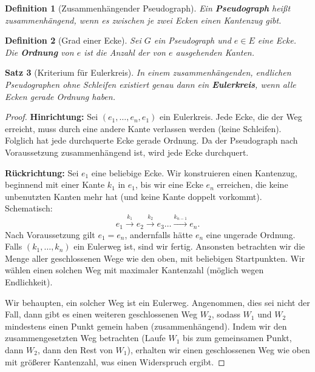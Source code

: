 \documentclass[a4paper,12pt]{article}
\theoremstyle{break}
\newtheorem{definition}{Definition}[section]
\newtheorem{theorem}[definition]{Satz}
\begin{document}
\begin{definition}[Zusammenhängender Pseudograph]
Ein \textbf{Pseudograph} heißt \textit{zusammenhängend}, wenn es zwischen je zwei Ecken einen Kantenzug gibt.
\end{definition}

\begin{definition}[Grad einer Ecke]
Sei \( G \) ein Pseudograph und \( e \in E \) eine Ecke. Die \textbf{Ordnung} von \( e \) ist die Anzahl der von \( e \) ausgehenden Kanten.
\end{definition}

\begin{theorem}[Kriterium für Eulerkreis]
In einem zusammenhängenden, endlichen Pseudographen ohne Schleifen existiert genau dann ein \textbf{Eulerkreis}, wenn alle Ecken gerade Ordnung haben.
\end{theorem}

\begin{proof}
\textbf{Hinrichtung:} Sei \( (e_1, \dots, e_n, e_1) \) ein Eulerkreis. Jede Ecke, die der Weg erreicht, muss durch eine andere Kante verlassen werden (keine Schleifen). Folglich hat jede durchquerte Ecke gerade Ordnung. Da der Pseudograph nach Voraussetzung zusammenhängend ist, wird jede Ecke durchquert.

\textbf{Rückrichtung:} Sei \( e_1 \) eine beliebige Ecke. Wir konstruieren einen Kantenzug, beginnend mit einer Kante \( k_1 \) in \( e_1 \), bis wir eine Ecke \( e_n \) erreichen, die keine unbenutzten Kanten mehr hat (und keine Kante doppelt vorkommt). Schematisch: 
\[
e_1 \xrightarrow{k_1} e_2 \xrightarrow{k_2} e_3 \dots \xrightarrow{k_{n-1}} e_n.
\]
Nach Voraussetzung gilt \( e_1 = e_n \), andernfalls hätte \( e_n \) eine ungerade Ordnung. Falls \( (k_1, \dots, k_n) \) ein Eulerweg ist, sind wir fertig. Ansonsten betrachten wir die Menge aller geschlossenen Wege wie den oben, mit beliebigen Startpunkten. Wir wählen einen solchen Weg mit maximaler Kantenzahl (möglich wegen Endlichkeit). 

Wir behaupten, ein solcher Weg ist ein Eulerweg. Angenommen, dies sei nicht der Fall, dann gibt es einen weiteren geschlossenen Weg \( W_2 \), sodass \( W_1 \) und \( W_2 \) mindestens einen Punkt gemein haben (zusammenhängend). Indem wir den zusammengesetzten Weg betrachten (Laufe \( W_1 \) bis zum gemeinsamen Punkt, dann \( W_2 \), dann den Rest von \( W_1 \)), erhalten wir einen geschlossenen Weg wie oben mit größerer Kantenzahl, was einen Widerspruch ergibt.
\end{proof}
\end{document}
